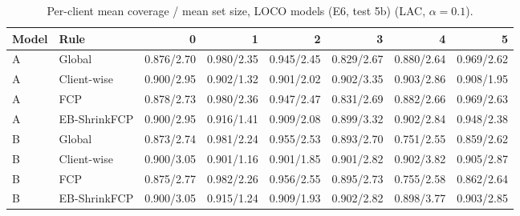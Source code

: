 \documentclass[10pt]{article}
\begin{document}
\begin{table}[!htbp]
\centering
\scriptsize
\caption{Per-client mean coverage / mean set size, LOCO models (E6, test 5b) (LAC, $\alpha=0.1$).}
\label{tab:s5pcE6}
\begin{tabular}{@{}llrrrrrr@{}}
\toprule
Model & Rule & 0 & 1 & 2 & 3 & 4 & 5 \\
\midrule
A & Global & 0.876/2.70 & 0.980/2.35 & 0.945/2.45 & 0.829/2.67 & 0.880/2.64 & 0.969/2.62 \\
A & Client-wise & 0.900/2.95 & 0.902/1.32 & 0.901/2.02 & 0.902/3.35 & 0.903/2.86 & 0.908/1.95 \\
A & FCP & 0.878/2.73 & 0.980/2.36 & 0.947/2.47 & 0.831/2.69 & 0.882/2.66 & 0.969/2.63 \\
A & EB-ShrinkFCP & 0.900/2.95 & 0.916/1.41 & 0.909/2.08 & 0.899/3.32 & 0.902/2.84 & 0.948/2.38 \\
B & Global & 0.873/2.74 & 0.981/2.24 & 0.955/2.53 & 0.893/2.70 & 0.751/2.55 & 0.859/2.62 \\
B & Client-wise & 0.900/3.05 & 0.901/1.16 & 0.901/1.85 & 0.901/2.82 & 0.902/3.82 & 0.905/2.87 \\
B & FCP & 0.875/2.77 & 0.982/2.26 & 0.956/2.55 & 0.895/2.73 & 0.755/2.58 & 0.862/2.64 \\
B & EB-ShrinkFCP & 0.900/3.05 & 0.915/1.24 & 0.909/1.93 & 0.902/2.82 & 0.898/3.77 & 0.903/2.85 \\
\bottomrule
\end{tabular}
\end{table}
\end{document}
